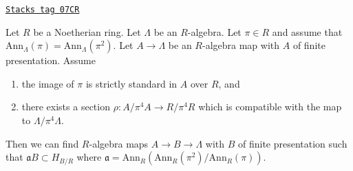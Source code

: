 \begin{lemma}[Desingularize]
\label{smoothing-lemma-desingularize}
\href{https://stacks.math.columbia.edu/tag/07CR}{\texttt{Stacks tag 07CR}}

Let $R$ be a Noetherian ring.
Let $\Lambda$ be an $R$-algebra. Let $\pi \in R$ and
assume that $\text{Ann}_\Lambda(\pi) = \text{Ann}_\Lambda(\pi^2)$. Let
$A \to \Lambda$ be an $R$-algebra map with $A$ of finite
presentation. Assume
\begin{enumerate}
\item the image of $\pi$ is strictly standard in $A$ over $R$, and
\item there exists a section $\rho : A/\pi^4 A \to R/\pi^4 R$
which is compatible with the map to $\Lambda/\pi^4 \Lambda$.
\end{enumerate}
Then we can find $R$-algebra maps $A \to B \to \Lambda$ with $B$
of finite presentation such that $\mathfrak a B \subset H_{B/R}$ where
$\mathfrak a = \text{Ann}_R(\text{Ann}_R(\pi^2)/\text{Ann}_R(\pi))$.
\end{lemma}

